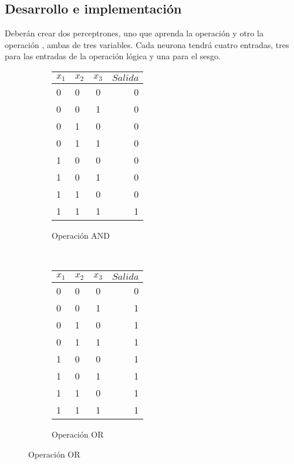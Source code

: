 \subsection{Desarrollo e implementaci\'on}

\noindent Deberán crear dos perceptrones, uno que aprenda la operación  y otro la operación , ambas de tres variables. Cada neurona tendrá cuatro entradas, tres para las entradas de la operación lógica y una para el sesgo.\par

\begin{figure}[H]
    \centering
    \begin{subfigure}[b]{0.4\textwidth}
        \centering
        \begin{tabular}{ l l c | r }
          $x_1$ & $x_2$ & $x_3$ & $Salida$\\ \hline
          0 & 0 & 0 & 0  \\ \hline
          0 & 0 & 1 & 0  \\ \hline
          0 & 1 & 0 & 0  \\ \hline
          0 & 1 & 1 & 0  \\ \hline
          1 & 0 & 0 & 0  \\ \hline
          1 & 0 & 1 & 0  \\ \hline
          1 & 1 & 0 & 0  \\ \hline
          1 & 1 & 1 & 1  \\
        \end{tabular}
        \caption{Operación AND}
    \end{subfigure}
    ~ 
    \begin{subfigure}[b]{0.4\textwidth}
        \centering
        \begin{tabular}{ l l c | r }
          $x_1$ & $x_2$ & $x_3$ & $Salida$\\ \hline
          0 & 0 & 0 & 0  \\ \hline
          0 & 0 & 1 & 1  \\ \hline
          0 & 1 & 0 & 1  \\ \hline
          0 & 1 & 1 & 1  \\ \hline
          1 & 0 & 0 & 1  \\ \hline
          1 & 0 & 1 & 1  \\ \hline
          1 & 1 & 0 & 1  \\ \hline
          1 & 1 & 1 & 1  \\
        \end{tabular}
        \caption{Operación OR}
    \end{subfigure}
\end{figure}


